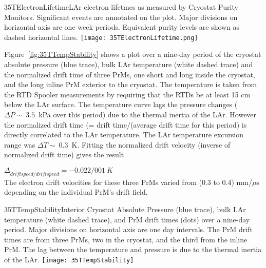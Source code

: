 \begin{cdrfigure}{35TElectronLifetime}{LAr electron lifetmes as measured by 
Cryostat Purity Monitors. Significant events are annotated on the plot. Major divisions on horizontal axis 
are one week periods. Equivalent purity levels are shown as dashed horizontal lines.}
  \texttt{[image: 35TElectronLifetime.png]}
\end{cdrfigure}

Figure~\ref{fig:35TTempStability} shows a plot over a nine-day period of the cryostat absolute pressure (blue 
trace), bulk LAr temperature (white dashed trace) and the normalized drift time of three PrMs, one short 
and long inside the cryostat, and the long inline PrM exterior to the cryostat. The temperature is taken 
from the RTD Spooler measurements by requiring that the RTDs be at least 15 cm below the LAr surface. 
The temperature curve lags the pressure changes ($\Delta P \sim~3.5$~kPa over this period) due to the thermal 
inertia of the LAr. However  the normalized drift time (= drift time/(average drift time for this period) is 
directly correlated to the LAr temperature. The LAr temperature excursion range was $\Delta T \sim~0.3$~K. 
Fitting the normalized drift velocity (inverse of normalized drift time) gives the result 


 $\Delta_{driftspeed/\overline{driftspeed}} = -0.022/001~K$\\
 
The electron drift velocities for these three PrMs varied from (0.3 to 0.4) mm/$\mu$s depending on the individual PrM's drift field. 

\begin{cdrfigure}{35TTempStability}{Interior Cryostat Absolute Pressure 
(blue trace), bulk LAr temperature (white dashed trace), and PrM drift times (dots) over a nine-day period. 
Major divisions on horizontal axis are one day intervals. The PrM drift times are from three PrMs, two in 
the cryostat, and the third from the inline PrM. The lag between the temperature and pressure is due to 
the thermal inertia of the LAr.}
  \texttt{[image: 35TTempStability]}
\end{cdrfigure}

